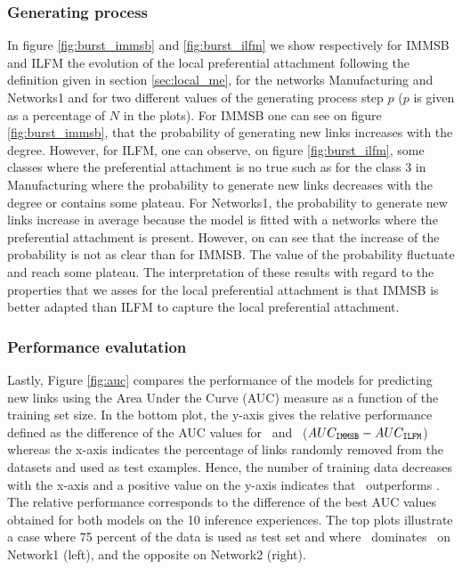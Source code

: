 


\subsubsection{Generating process}
In figure \ref{fig:burst_immsb} and \ref{fig:burst_ilfm} we show respectively for IMMSB and ILFM the evolution of the local preferential attachment following the definition given in section \ref{sec:local_me}, for the networks Manufacturing and Networks1 and for two different values of the generating process step $p$ ($p$ is given as a percentage of $N$ in the plots). For IMMSB one can see on figure \ref{fig:burst_immsb}, that the probability of generating new links increases with the degree. However, for ILFM, one can observe, on figure \ref{fig:burst_ilfm}, some classes where the preferential attachment is no true such as for the class 3 in Manufacturing where the probability to generate new links decreases with the degree or contains some plateau. For Networks1, the probability to generate new links increase in average because the model is fitted with a networks where the preferential attachment is present. However, on can see that the increase of the probability is not as clear than for IMMSB. The value of the probability fluctuate and reach some plateau. The interpretation of these results with regard to the properties that we asses for the local preferential attachment is that IMMSB is better adapted than ILFM to capture the local preferential attachment.


\begin{figure}[h]
\centering

\end{figure}

\begin{figure}[h]
\centering

\end{figure}

\subsubsection{Performance evalutation}


Lastly, Figure \ref{fig:auc} compares the performance of the models for predicting new links using the Area Under the Curve (AUC) measure as a function of the training set size. In the bottom plot, the y-axis gives the relative performance defined as the difference of the AUC values for \imb\ and \ifm\ ($AUC_{\texttt{IMMSB}} - AUC_{\texttt{ILFM}}$) whereas the x-axis indicates the percentage of links randomly removed from the datasets and used as test examples. Hence, the number of training data decreases with the x-axis and a positive value on the y-axis indicates that \imb\ outperforms \ifm.  The relative performance corresponds to the difference of the best AUC values obtained for both models on the 10 inference experiences. The top plots illustrate a case where 75 percent of the data is used as test set and where \imb\ dominates \ifm\ on Network1 (left), and the opposite on Network2 (right).

